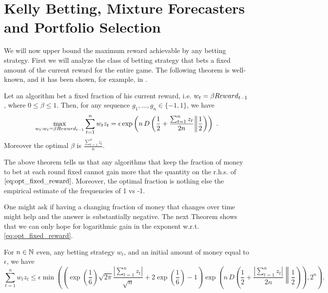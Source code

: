 \section{Kelly Betting, Mixture Forecasters and Portfolio Selection}

We will now upper bound the maximum reward achievable by any betting strategy.
First we will analyze the class of betting strategy that bets a fixed amount of the current reward for the entire game.
The following theorem is well-known, and it has been shown, for example, in \cite{}.

\begin{theorem}
\label{thm:oracle_fraction}
Let an algorithm bet a fixed fraction of his current reward, i.e. $w_t=\beta Reward_{t-1}$, where $0\leq\beta\leq1$. Then, for any sequence $g_1, \ldots, g_n \in \{-1,1\}$, we have
\begin{equation}
\label{eq:opt_fixed_reward}
\max_{w_t: w_t=\beta Reward_{t-1}} \sum_{t=1}^n w_t z_t 
= \epsilon \exp\left(n\, D\left(\frac{1}{2}+\frac{\sum_{t=1}^n z_t}{2 n}\middle\|\frac{1}{2}\right)\right)~. 
\end{equation}
Moreover the optimal $\beta$ is $\frac{\sum_{t=1}^n z_t}{n}$.
\end{theorem}

The above theorem tells us that any algorithms that keep the fraction of money to bet at each round fixed cannot gain more that the quantity on the r.h.s. of $\eqref{eq:opt_fixed_reward}$. Moreover, the optimal fraction is nothing else the empirical estimate of the frequencies of 1 vs -1.

One might ask if having a changing fraction of money that changes over time might help and the answer is substantially negative. The next Theorem shows that we can only hope for logarithmic gain in the exponent w.r.t. \eqref{eq:opt_fixed_reward}.
\begin{theorem}
\label{thm:oracle_fraction_changing}
For $n \in \mathbb{N}$ even, any betting strategy $w_t$, and an initial amount of money equal to $\epsilon$, we have
\[
\sum_{t=1}^n w_t z_t 
\leq \epsilon \min\left(\left(\exp\left(\frac{1}{6}\right)\sqrt{2 \pi}\frac{|\sum_{t=1}^n z_t|}{\sqrt{n}} +2\exp\left(\frac{1}{6}\right)-1\right) \exp\left(n\, D\left(\frac{1}{2}+\frac{|\sum_{t=1}^n z_t|}{2 n}\middle\|\frac{1}{2}\right)\right), 2^n\right).
\]
\end{theorem}

